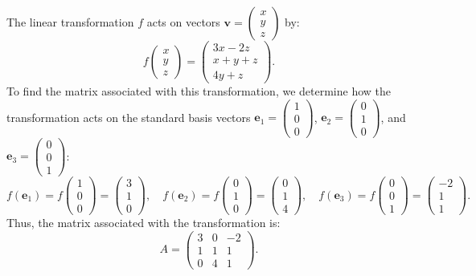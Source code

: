 \documentclass[11pt]{article}
\begin{document}
The linear transformation \( f \) acts on vectors \( \mathbf{v} = \begin{pmatrix} x \\ y \\ z \end{pmatrix} \) by:
\[
f \begin{pmatrix} x \\ y \\ z \end{pmatrix} = \begin{pmatrix} 3x - 2z \\ x + y + z \\ 4y + z \end{pmatrix}.
\]
To find the matrix associated with this transformation, we determine how the transformation acts on the standard basis vectors \( \mathbf{e}_1 = \begin{pmatrix} 1 \\ 0 \\ 0 \end{pmatrix} \), \( \mathbf{e}_2 = \begin{pmatrix} 0 \\ 1 \\ 0 \end{pmatrix} \), and \( \mathbf{e}_3 = \begin{pmatrix} 0 \\ 0 \\ 1 \end{pmatrix} \):
\[
f(\mathbf{e}_1) = f\begin{pmatrix} 1 \\ 0 \\ 0 \end{pmatrix} = \begin{pmatrix} 3 \\ 1 \\ 0 \end{pmatrix},
\quad f(\mathbf{e}_2) = f\begin{pmatrix} 0 \\ 1 \\ 0 \end{pmatrix} = \begin{pmatrix} 0 \\ 1 \\ 4 \end{pmatrix},
\quad f(\mathbf{e}_3) = f\begin{pmatrix} 0 \\ 0 \\ 1 \end{pmatrix} = \begin{pmatrix} -2 \\ 1 \\ 1 \end{pmatrix}.
\]
Thus, the matrix associated with the transformation is:
\[
A = \begin{pmatrix}
3 & 0 & -2 \\
1 & 1 & 1 \\
0 & 4 & 1
\end{pmatrix}.
\]
\newpage
\end{document}
